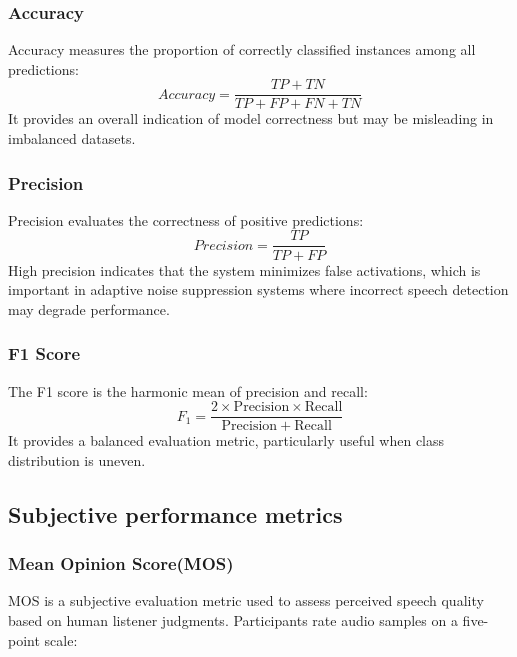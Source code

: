 \subsubsection{Accuracy}
Accuracy measures the proportion of correctly classified instances among all predictions:
\begin{equation}
Accuracy = \frac{TP + TN}{TP + FP + FN + TN}
\end{equation}
It provides an overall indication of model correctness but may be misleading in imbalanced datasets. 
\subsubsection{Precision}
Precision evaluates the correctness of positive predictions:
\begin{equation}
Precision = \frac{TP}{TP + FP}
\end{equation}
High precision indicates that the system minimizes false activations, which is important in adaptive noise suppression systems where incorrect speech detection may degrade performance.


\subsubsection{F1 Score}
The F1 score is the harmonic mean of precision and recall:
\begin{equation}
F_1 = \frac{2 \times \mathrm{Precision} \times \mathrm{Recall}}
{\mathrm{Precision} + \mathrm{Recall}}
\end{equation}
It provides a balanced evaluation metric, particularly useful when class distribution is uneven.
\subsection{Subjective performance metrics}
\subsubsection{Mean Opinion Score(MOS)}
MOS is a subjective evaluation metric used to assess perceived speech quality based on human listener judgments. Participants rate audio samples on a five-point scale:

